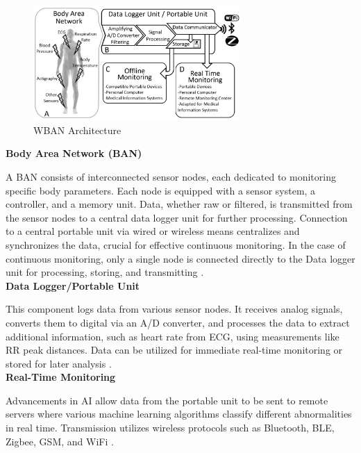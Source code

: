 \begin{figure}[htbp]
	\centering
	\includegraphics[width=0.7\textwidth]{images/remote architecture}
	\caption{WBAN Architecture~\cite{Dias2018Wearable}}
	\label{fig:wbna_architecture}
\end{figure}

\noindent\textbf{Body Area Network (BAN)}

\noindent A BAN consists of interconnected sensor nodes, each dedicated to monitoring specific body parameters. Each node is equipped with a sensor system, a controller, and a memory unit. Data, whether raw or filtered, is transmitted from the sensor nodes to a central data logger unit for further processing. Connection to a central portable unit via wired or wireless means centralizes and synchronizes the data, crucial for effective continuous monitoring. In the case of continuous monitoring, only a single node is connected directly to the Data logger unit for processing, storing, and transmitting \cite{Dias2018Wearable, Pantelopoulos2010Survey}.\\

\noindent\textbf{Data Logger/Portable Unit}

\noindent This component logs data from various sensor nodes. It receives analog signals, converts them to digital via an A/D converter, and processes the data to extract additional information, such as heart rate from ECG, using measurements like RR peak distances. Data can be utilized for immediate real-time monitoring or stored for later analysis \cite{Dias2018Wearable}.\\

\noindent\textbf{Real-Time Monitoring}

\noindent Advancements in AI allow data from the portable unit to be sent to remote servers where various machine learning algorithms classify different abnormalities in real time. Transmission utilizes wireless protocols such as Bluetooth, BLE, Zigbee, GSM, and WiFi \cite{Dias2018Wearable, Shaown2019IoT}.\\

